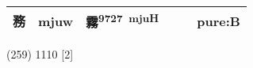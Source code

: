 \documentclass[14pt,a4paper]{scrartcl}
\begin{document}
\begin{longtable}[c]{@{}llllll@{}}
\begin{minipage}[t]{0.14\columnwidth}
務
\strut\end{minipage} &
\begin{minipage}[t]{0.14\columnwidth}\raggedright\strut
mjuw
\strut\end{minipage} &
\begin{minipage}[t]{0.14\columnwidth}\raggedright\strut
霧\textsuperscript{9727~mjuH}
\strut\end{minipage} &
\begin{minipage}[t]{0.14\columnwidth}\raggedright\strut
\strut\end{minipage} &
\begin{minipage}[t]{0.14\columnwidth}\raggedright\strut
\strut\end{minipage} &
\begin{minipage}[t]{0.14\columnwidth}\raggedright\strut
pure:B
\strut\end{minipage}\tabularnewline
\bottomrule
\end{longtable}

(259) 1110 {[}2{]}
\end{document}
